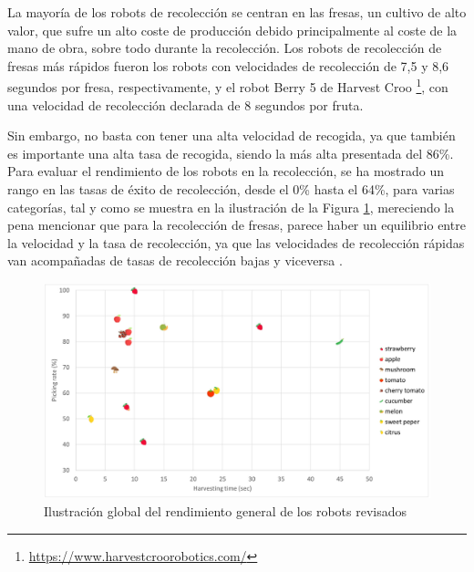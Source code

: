 La mayoría de los robots de recolección se centran en las fresas, un cultivo de alto valor, que sufre un alto coste de producción debido principalmente al coste de la mano de obra, sobre todo durante la recolección. Los robots de recolección de fresas más rápidos fueron los robots con velocidades de recolección de 7,5 y 8,6 segundos por fresa, respectivamente, y el robot Berry 5 de Harvest Croo \footnote{\url{https://www.harvestcroorobotics.com/}}, con una velocidad de recolección declarada de 8 segundos por fruta. 

Sin embargo, no basta con tener una alta velocidad de recogida, ya que también es importante una alta tasa de recogida, siendo la más alta presentada del 86\%. 
Para evaluar el rendimiento de los robots en la recolección, se ha mostrado un rango en las tasas de éxito de recolección, desde el 0\% hasta el 64\%, para varias categorías, tal y como se muestra en la ilustración de la Figura \ref{fig:RendimientosCosecha}, mereciendo la pena mencionar que para la recolección de fresas, parece haber un equilibrio entre la velocidad y la tasa de recolección, ya que las velocidades de recolección rápidas van acompañadas de tasas de recolección bajas y viceversa \cite{Fountas20}. 

\begin{figure} [H]
    \begin{center}
      \includegraphics[width=15cm]{figs/Rendimiento cosecha robots.png}
    \end{center}
    \caption{Ilustración global del rendimiento general de los robots revisados}
    \label{fig:RendimientosCosecha}
\end{figure}

